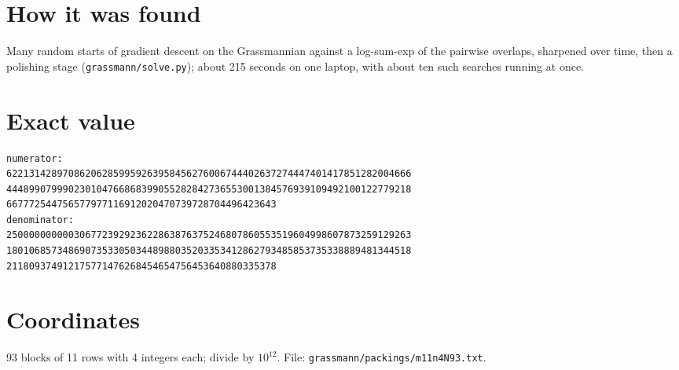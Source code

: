 \documentclass[11pt,a4paper]{article}
\begin{document}
\section{How it was found}
Many random starts of gradient descent on the Grassmannian against a log-sum-exp of the pairwise overlaps, sharpened over time, then a polishing stage (\texttt{grassmann/solve.py}); about 215 seconds on one laptop, with about ten such searches running at once.


\appendix
\section{Exact value}
{\small
\begin{verbatim}
numerator:
622131428970862062859959263958456276006744402637274447401417851282004666
444899079990230104766868399055282842736553001384576939109492100122779218
667772544756577977116912020470739728704496423643
denominator:
250000000000306772392923622863876375246807860553519604998607873259129263
180106857348690735330503448988035203353412862793485853735338889481344518
211809374912175771476268454654756453640880335378
\end{verbatim}}

\section{Coordinates}
93 blocks of 11 rows with 4 integers each; divide by $10^{12}$. File: \texttt{grassmann/packings/m11n4N93.txt}.
{\tiny
\begin{multicols}{3}
\end{multicols}}
\end{document}
